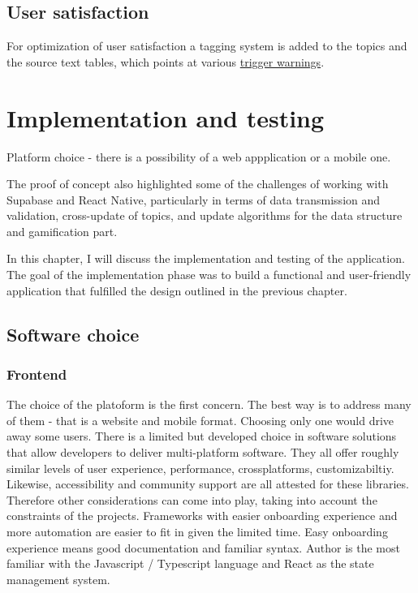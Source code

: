 \documentclass{report}
\begin{document}
\section{User satisfaction}
For optimization of user satisfaction a tagging system is added to the topics and the source text tables, which points at various \href{https://adancewithbooks.wordpress.com/2019/09/22/a-small-list-of-trigger-warnings-you-can-use/}{trigger warnings}.
\newpage

\chapter{Implementation and testing}
Platform choice - there is a possibility of a web appplication or a mobile one.

The proof of concept also highlighted some of the challenges of working with Supabase and React Native, particularly in terms of data transmission and validation, cross-update of topics, and update algorithms for the data structure and gamification part.

In this chapter, I will discuss the implementation and testing of the application. The goal of the implementation phase was to build a functional and user-friendly application that fulfilled the design outlined in the previous chapter.

\section{Software choice}

\subsection{Frontend}
The choice of the platoform is the first concern. The best way is to address many of them - that is a website and mobile format. Choosing only one would drive away some users. 
There is a limited but developed choice in software solutions that allow developers to deliver multi-platform software. They all offer roughly similar levels of user experience, performance, crossplatforms, customizabiltiy. Likewise, accessibility and community support are all attested for these libraries.
Therefore other considerations can come into play, taking into account the constraints of the projects. Frameworks with easier onboarding experience and more automation are easier to fit in given the limited time. Easy onboarding experience means good documentation and familiar syntax.
Author is the most familiar with the Javascript / Typescript language and React as the state management system.
\end{document}
